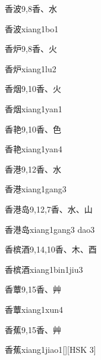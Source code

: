 \begin{entry}{香波}{9,8}{⾹、⽔}
  \begin{phonetics}{香波}{xiang1bo1}
  \end{phonetics}
\end{entry}

\begin{entry}{香炉}{9,8}{⾹、⽕}
  \begin{phonetics}{香炉}{xiang1lu2}
  \end{phonetics}
\end{entry}

\begin{entry}{香烟}{9,10}{⾹、⽕}
  \begin{phonetics}{香烟}{xiang1yan1}
  \end{phonetics}
\end{entry}

\begin{entry}{香艳}{9,10}{⾹、⾊}
  \begin{phonetics}{香艳}{xiang1yan4}
  \end{phonetics}
\end{entry}

\begin{entry}{香港}{9,12}{⾹、⽔}
  \begin{phonetics}{香港}{xiang1gang3}
  \end{phonetics}
\end{entry}

\begin{entry}{香港岛}{9,12,7}{⾹、⽔、⼭}
  \begin{phonetics}{香港岛}{xiang1gang3 dao3}
  \end{phonetics}
\end{entry}

\begin{entry}{香槟酒}{9,14,10}{⾹、⽊、⾣}
  \begin{phonetics}{香槟酒}{xiang1bin1jiu3}
  \end{phonetics}
\end{entry}

\begin{entry}{香蕈}{9,15}{⾹、⾋}
  \begin{phonetics}{香蕈}{xiang1xun4}
  \end{phonetics}
\end{entry}

\begin{entry}{香蕉}{9,15}{⾹、⾋}
  \begin{phonetics}{香蕉}{xiang1jiao1}[][HSK 3]
  \end{phonetics}
\end{entry}


